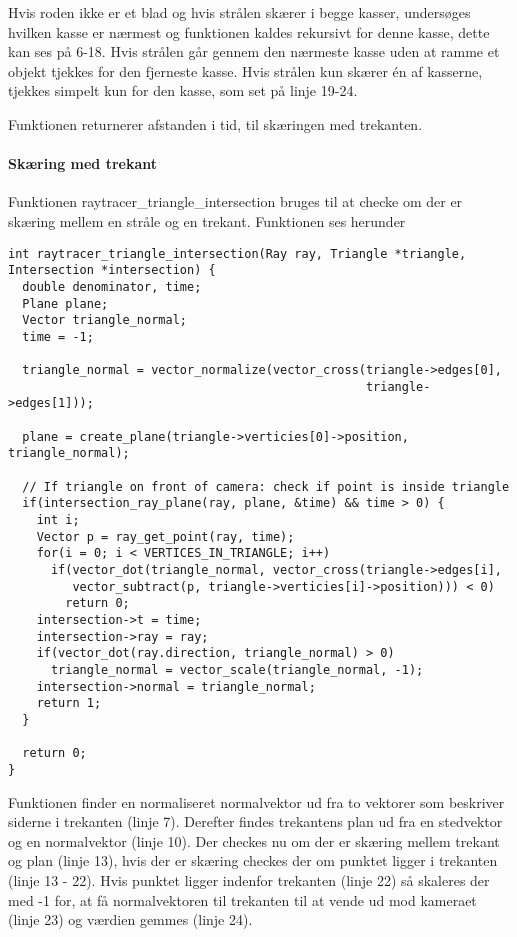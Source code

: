 Hvis roden ikke er et blad og hvis strålen skærer i begge kasser, undersøges hvilken kasse er nærmest og funktionen kaldes rekursivt for denne kasse, dette kan ses på 6-18. Hvis strålen går gennem den nærmeste kasse uden at ramme et objekt tjekkes for den fjerneste kasse. Hvis strålen kun skærer én af kasserne, tjekkes simpelt kun for den kasse, som set på linje 19-24.

Funktionen returnerer afstanden i tid, til skæringen med trekanten.

\paragraph{Skæring med trekant}

Funktionen raytracer\_triangle\_intersection bruges til at checke om der er skæring mellem en stråle og en trekant. Funktionen ses herunder

\begin{lstlisting}[style=Cstyle, caption=Funktionen der finder skæring med trekant]
int raytracer_triangle_intersection(Ray ray, Triangle *triangle, Intersection *intersection) {
  double denominator, time;
  Plane plane;
  Vector triangle_normal;
  time = -1;

  triangle_normal = vector_normalize(vector_cross(triangle->edges[0], 
                                                  triangle->edges[1]));

  plane = create_plane(triangle->verticies[0]->position, triangle_normal);

  // If triangle on front of camera: check if point is inside triangle
  if(intersection_ray_plane(ray, plane, &time) && time > 0) {
    int i;
    Vector p = ray_get_point(ray, time);
    for(i = 0; i < VERTICES_IN_TRIANGLE; i++)
      if(vector_dot(triangle_normal, vector_cross(triangle->edges[i], 
         vector_subtract(p, triangle->verticies[i]->position))) < 0)
        return 0;
    intersection->t = time;
    intersection->ray = ray;
    if(vector_dot(ray.direction, triangle_normal) > 0)
      triangle_normal = vector_scale(triangle_normal, -1);
    intersection->normal = triangle_normal;
    return 1;
  }

  return 0;
}
\end{lstlisting}

Funktionen finder en normaliseret normalvektor ud fra to vektorer som beskriver siderne i trekanten (linje 7). Derefter findes trekantens plan ud fra en stedvektor og en normalvektor (linje 10). Der checkes nu om der er skæring mellem trekant og plan (linje 13), hvis der er skæring checkes der om punktet ligger i trekanten (linje 13 - 22). Hvis punktet ligger indenfor trekanten (linje 22) så skaleres der med -1 for, at få normalvektoren til trekanten til at vende ud mod kameraet (linje 23) og værdien gemmes (linje 24).

